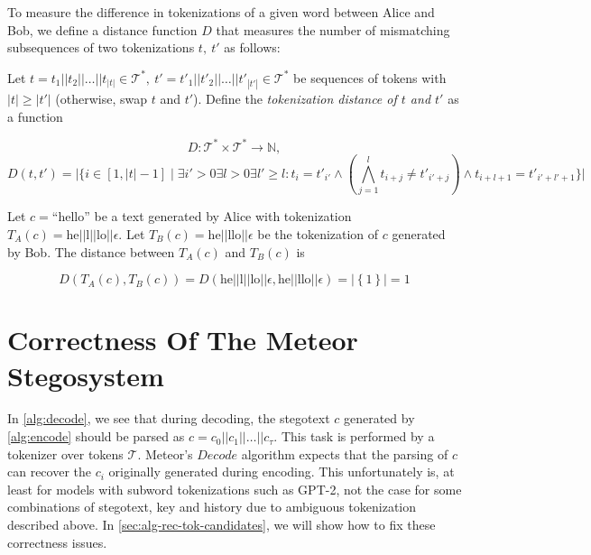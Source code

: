 To measure the difference in tokenizations of a given word between Alice and Bob, we define a distance function $D$ that measures the number of mismatching subsequences of two tokenizations $t,~ t'$ as follows:

\begin{definition}
Let $t = t_1 || t_2 || \dots || t_{|t|} \in \mathcal{T}^*,~ t' = t'_1 || t'_2 || \dots || t'_{|t'|} \in \mathcal{T}^*$ be sequences of tokens with $|t| \geq |t'|$ (otherwise, swap $t$ and $t'$).
Define the \emph{tokenization distance of $t$ and $t'$} as a function

$$D \colon \mathcal{T}^* \times \mathcal{T}^* \rightarrow \mathbb{N},$$
$$D(t, t') = \big| \big\{ i \in [1, |t|-1] \mid \exists i' > 0 \exists l > 0 \exists l' \geq l: t_{i} = t'_{i'} \land \left( \bigwedge_{j=1}^{l} t_{i+j} \neq t'_{i'+j} \right) \land t_{i+l+1} = t'_{i'+l'+1} \big\} \big|$$
\end{definition}

\begin{example}
Let $c = \textrm{``hello''}$ be a text generated by Alice with tokenization $T_A(c) = \textrm{he}||\textrm{l}||\textrm{lo}||\epsilon$.
Let $T_B(c) = \textrm{he}||\textrm{llo}||\epsilon$ be the tokenization of $c$ generated by Bob.
The distance between $T_A(c)$ and $T_B(c)$ is 

$$
D(T_A(c), T_B(c))
= D(\textrm{he}||\textrm{l}||\textrm{lo}||\epsilon, \textrm{he}||\textrm{llo}||\epsilon)
= \left| \left\{ 1 \right\} \right| = 1
$$
\end{example}

\section{Correctness Of The Meteor Stegosystem}

In \autoref{alg:decode}, we see that during decoding, the stegotext $c$ generated by \autoref{alg:encode} should be parsed as $c = c_0 ||c_1 || \dots || c_{\tau}$.
This task is performed by a tokenizer over tokens $\mathcal{T}$.
Meteor's $Decode$ algorithm expects that the parsing of $c$ can recover the $c_i$ originally generated during encoding.
This unfortunately is, at least for models with subword tokenizations such as GPT-2, not the case for some combinations of stegotext, key and history due to ambiguous tokenization described above.
In \autoref{sec:alg-rec-tok-candidates}, we will show how to fix these correctness issues.

